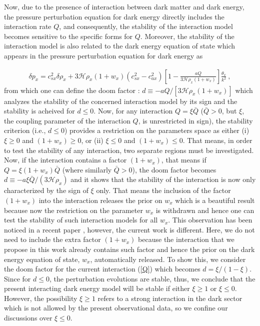 \documentclass[superscriptaddress,oneolumn,secnumarabic,
amssymb,amsmath,nobibnotes,aps,prd,showpacs,nofootinbib]{revtex4}%
\begin{document}
Now, due to the presence of interaction between dark matter and dark energy, the pressure perturbation equation for dark energy directly includes the interaction rate $Q$, and consequently, the stability of the interaction model becomes sensitive to the specific forms for $Q$. Moreover, the stability of the interaction model is also related to the dark energy equation of state which appears in the pressure perturbation equation for dark energy as \cite{ref:Gavela2009}

\begin{eqnarray}
\delta p_{x}
=c_{sx}^{2}\delta \rho _{x}+3\mathcal{H}\rho
_{x}(1+w_{x})(c_{sx}^{2}-c_{ax}^{2})\left[ 1-\frac{aQ}{3\mathcal{H}\rho
_{x}(1+w_{x})}\right] \frac{\theta _{x}}{k^{2}}~,
\label{eq:deltap}
\end{eqnarray}
from which one can define the doom factor \cite{ref:Gavela2009}: $d\equiv-aQ/[3\mathcal{H}\rho_x(1+w_x)]$  which analyzes the stability of the concerned interaction model by its sign and
the stability is acheived for $d \leq 0$. Now, for any interaction $Q= \xi \bar{Q}$
($\bar{Q} >0$, but $\xi$, the coupling parameter of the interaction
$Q$, is unrestricted in sign), the stability criterion (i.e., $d \leq 0$) provides 
a restriction on the parameters space as either (i) $\xi \geq 0$ and  $(1+w_{x})\geq 0$, or  (ii) $\xi \leq 0$ and $(1+w_{x})\leq 0$. That  means,
in order to test the stability of any interaction, two separate regions must be investigated.  Now, if the interaction contains a factor $(1+w_x)$, that means if $Q = \xi (1+w_x) \bar{Q}$ (where similarly $\bar{Q} > 0$), the doom factor becomes $d \equiv -a\xi \bar{Q}/ ( 3\mathcal{H}\rho_x )$ and it shows that the stability of the interaction is now only characterized by the sign of $\xi$ only. That means the inclusion of the factor $(1+w_x)$ into the interaction releases the prior on $w_x$ which is a beautiful result because now the restriction on the parameter $w_x$ is withdrawn and hence one can test the stability of such interaction models for all $w_x$. This observation has been noticed in a recent paper \cite{ypb}, however, the current work is different. Here, we do not need to include the extra factor $(1+w_x)$ because the interaction that we propose in this work already contains such factor and hence the prior on the dark energy equation of state, $w_x$, automatically released.
To show this, we consider the doom factor for the current interaction (\ref{Q}) which becomes $d = \xi/(1-\xi)$. Since for $d\leq0$, the perturbation evolutions are stable, thus, we conclude that the present interacting dark energy model will be stable if either $\xi\geq1$ or $\xi\leq 0$. However, the possibility $\xi\geq1$ refers to a strong interaction in the dark sector which is not allowed by the present observational data, so we confine our discussions over $\xi\leq0$.
\end{document}
